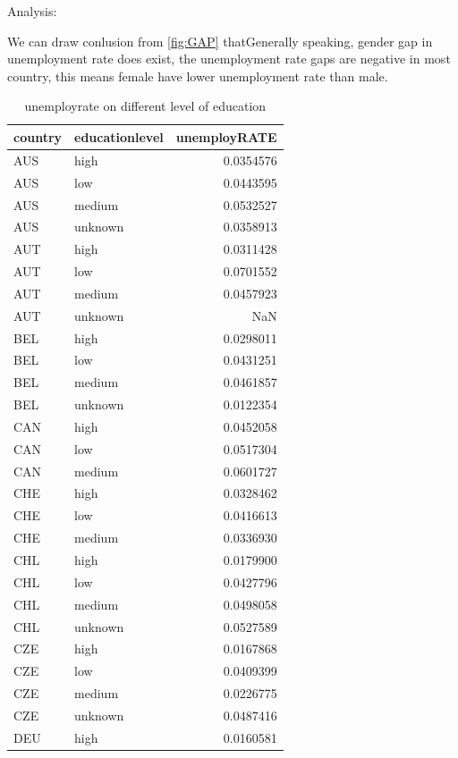 \documentclass[11pt,a4paper,]{article}
\begin{document}
Analysis:

We can draw conlusion from \ref{fig:GAP} thatGenerally speaking, gender gap in unemployment rate does exist, the unemployment rate gaps are negative in most country, this means female have lower unemployment rate than male.

\begin{table}

\caption{\label{tab:unnamed-chunk-15}unemployrate on different level of education}
\centering
\begin{tabular}[t]{l|l|r}
\hline
country & educationlevel & unemployRATE\\
\hline
AUS & high & 0.0354576\\
\hline
AUS & low & 0.0443595\\
\hline
AUS & medium & 0.0532527\\
\hline
AUS & unknown & 0.0358913\\
\hline
AUT & high & 0.0311428\\
\hline
AUT & low & 0.0701552\\
\hline
AUT & medium & 0.0457923\\
\hline
AUT & unknown & NaN\\
\hline
BEL & high & 0.0298011\\
\hline
BEL & low & 0.0431251\\
\hline
BEL & medium & 0.0461857\\
\hline
BEL & unknown & 0.0122354\\
\hline
CAN & high & 0.0452058\\
\hline
CAN & low & 0.0517304\\
\hline
CAN & medium & 0.0601727\\
\hline
CHE & high & 0.0328462\\
\hline
CHE & low & 0.0416613\\
\hline
CHE & medium & 0.0336930\\
\hline
CHL & high & 0.0179900\\
\hline
CHL & low & 0.0427796\\
\hline
CHL & medium & 0.0498058\\
\hline
CHL & unknown & 0.0527589\\
\hline
CZE & high & 0.0167868\\
\hline
CZE & low & 0.0409399\\
\hline
CZE & medium & 0.0226775\\
\hline
CZE & unknown & 0.0487416\\
\hline
DEU & high & 0.0160581\\

\end{tabular}
\end{table}
\end{document}
